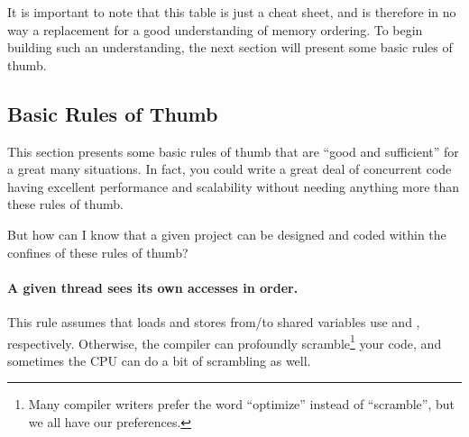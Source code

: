 It is important to note that this table is just a cheat sheet,
and is therefore in no way a replacement for a good understanding
of memory ordering.
To begin building such an understanding, the next section will
present some basic rules of thumb.

\subsection{Basic Rules of Thumb}
\label{sec:memorder:Basic Rules of Thumb}

This section presents some basic rules of thumb that are ``good and
sufficient'' for a great many situations.
In fact, you could write a great deal of concurrent code having
excellent performance and scalability without needing anything more
than these rules of thumb.

\QuickQuiz{}
	But how can I know that a given project can be designed
	and coded within the confines of these rules of thumb?
 \QuickQuizEnd

\paragraph{A given thread sees its own accesses in order.}
This rule assumes that loads and stores from/to shared variables use
 and , respectively.
Otherwise, the compiler can profoundly scramble\footnote{
	Many compiler writers prefer the word ``optimize'' instead of
	``scramble'', but we all have our preferences.}
your code, and sometimes the CPU can do a bit of scrambling as well.

